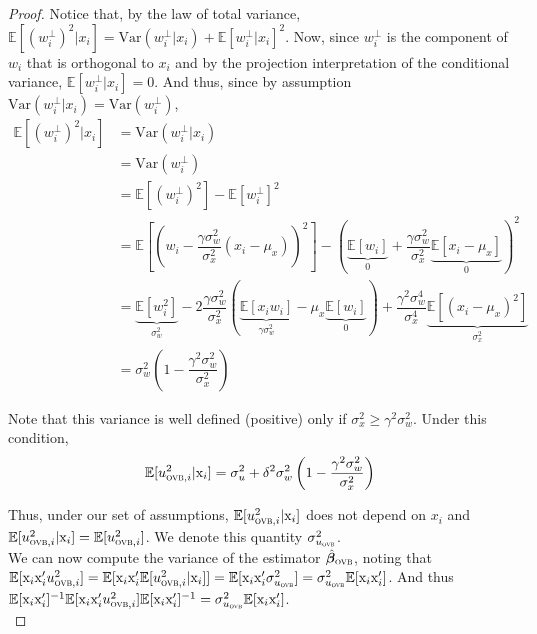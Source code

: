 \documentclass[usletter, 12pt]{article}
\begin{document}
\begin{proof}
				Notice that, by the law of total variance, $\mathbb{E}[(w_{i}^{\perp})^{2} | x_{i}] = \text{Var}(w_{i}^{\perp} | x_{i}) + \mathbb{E}[w_{i}^{\perp} | x_{i}]^{2}$. Now, since $w_{i}^{\perp}$ is the component of $w_{i}$ that is orthogonal to $x_{i}$ and by the projection interpretation of the conditional variance,  $\mathbb{E}[w_{i}^{\perp} | x_{i}] = 0$. And thus, since by assumption $\text{Var}(w_{i}^{\perp} | x_{i}) = \text{Var}(w_{i}^{\perp})$, 
				~
				\begin{align*}
					\mathbb{E}[(w_{i}^{\perp})^{2} | x_{i}] & = \text{Var}(w_{i}^{\perp} | x_{i})\\
					& = \text{Var}(w_{i}^{\perp}) \\
					& = \mathbb{E}[(w_{i}^{\perp})^{2}] - \mathbb{E}[w_{i}^{\perp}]^{2}\\
					& = \mathbb{E}\left[ \left(w_{i} - \dfrac{\gamma\sigma_{w}^{2}}{\sigma_{x}^{2}} (x_{i} - \mu_{x})\right)^{2} \right] - \left(\underbrace{\mathbb{E}[w_{i}]}_{0} + \dfrac{\gamma\sigma_{w}^{2}}{\sigma_{x}^{2}} \underbrace{\mathbb{E}[x_{i} - \mu_{x}]}_{0} \right)^{2}\\
					& = \underbrace{\mathbb{E}[w_{i}^{2}]}_{\sigma_{w}^{2}} - 2 \dfrac{\gamma\sigma_{w}^{2}}{\sigma_{x}^{2}} \left( \underbrace{\mathbb{E}[x_{i}w_{i}]}_{\gamma \sigma_{w}^{2}} - \mu_{x}\underbrace{\mathbb{E}[w_{i}]}_{0} \right) + \dfrac{\gamma^{2}\sigma_{w}^{4}}{\sigma_{x}^{4}} \underbrace{\mathbb{E}[(x_{i} - \mu_{x})^{2}]}_{\sigma_{x}^{2}}\\
					& = \sigma_{w}^{2} \left(1 - \dfrac{\gamma^{2}\sigma_{w}^{2}}{\sigma_{x}^{2}} \right)
				\end{align*}
				
				Note that this variance is well defined (positive) only if $\sigma_{x}^{2} \geq \gamma^{2}\sigma_{w}^{2}$. Under this condition, 
				~
				\begin{equation}
					\mathbb{E}[u_{\textsc{ovb}, i}^{2} | \text{x}_{i}] =  \sigma_{u}^{2} +  \delta^{2} \sigma_{w}^{2} \left(1 - \dfrac{\gamma^{2}\sigma_{w}^{2}}{\sigma_{x}^{2}} \right)
				\end{equation}
				
				Thus, under our set of assumptions, $\mathbb{E}[u_{\textsc{ovb}, i}^{2} | \text{x}_{i}]$ does not depend on $x_{i}$ and $\mathbb{E}[u_{\textsc{ovb}, i}^{2} | \text{x}_{i}] =  \mathbb{E}[u_{\textsc{ovb}, i}^{2}]$. We denote this quantity $\sigma_{u_{\textsc{ovb}}}^{2}$.\\
				
				We can now compute the variance of the estimator $\hat{\bm{\beta}}_{\textsc{ovb}}$, noting that $\mathbb{E}[\text{x}_{i}\text{x}_{i}'u_{\textsc{ovb}, i}^{2}] = \mathbb{E}[\text{x}_{i}\text{x}_{i}'\mathbb{E}[u_{\textsc{ovb}, i}^{2} | \text{x}_{i}]] =  \mathbb{E}[\text{x}_{i}\text{x}_{i}' \sigma_{u_{\textsc{ovb}}}^{2}] = \sigma_{u_{\textsc{ovb}}}^{2} \mathbb{E}[\text{x}_{i}\text{x}_{i}']$. And thus $\mathbb{E}[\text{x}_{i}\text{x}_{i}']^{-1} \mathbb{E}[\text{x}_{i}\text{x}_{i}'u_{\textsc{ovb}, i}^{2}] \mathbb{E}[\text{x}_{i}\text{x}_{i}']^{-1} = \sigma_{u_{\textsc{ovb}}}^{2} \mathbb{E}[\text{x}_{i}\text{x}_{i}']$.\\
				

\end{proof}
\end{document}
